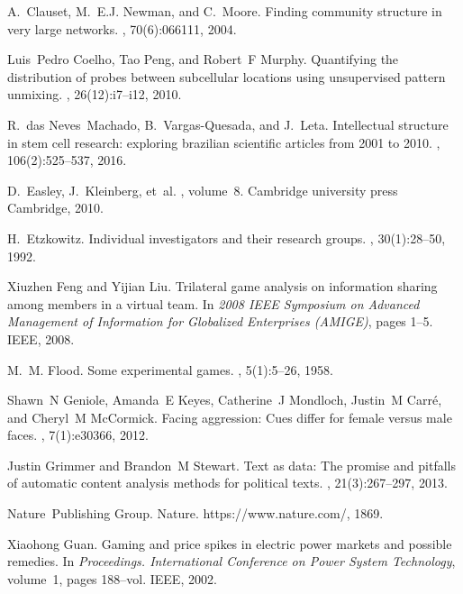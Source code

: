 \documentclass{article}
\theoremstyle{definition}
\begin{document}
\begin{thebibliography}{10}
    A.~Clauset, M.~E.J. Newman, and C.~Moore.
    \newblock Finding community structure in very large networks.
    , 70(6):066111, 2004.
    
    Luis~Pedro Coelho, Tao Peng, and Robert~F Murphy.
    \newblock Quantifying the distribution of probes between subcellular locations
      using unsupervised pattern unmixing.
    , 26(12):i7--i12, 2010.
    
    R.~das Neves~Machado, B.~Vargas-Quesada, and J.~Leta.
    \newblock Intellectual structure in stem cell research: exploring brazilian
      scientific articles from 2001 to 2010.
    , 106(2):525--537, 2016.
    
    D.~Easley, J.~Kleinberg, et~al.
    , volume~8.
    \newblock Cambridge university press Cambridge, 2010.
    
    H.~Etzkowitz.
    \newblock Individual investigators and their research groups.
    , 30(1):28--50, 1992.
    
    Xiuzhen Feng and Yijian Liu.
    \newblock Trilateral game analysis on information sharing among members in a
      virtual team.
    \newblock In {\em 2008 IEEE Symposium on Advanced Management of Information for
      Globalized Enterprises (AMIGE)}, pages 1--5. IEEE, 2008.
    
    M.~M. Flood.
    \newblock Some experimental games.
    , 5(1):5--26, 1958.
    
    Shawn~N Geniole, Amanda~E Keyes, Catherine~J Mondloch, Justin~M Carr{\'e}, and
      Cheryl~M McCormick.
    \newblock Facing aggression: Cues differ for female versus male faces.
    , 7(1):e30366, 2012.
    
    Justin Grimmer and Brandon~M Stewart.
    \newblock Text as data: The promise and pitfalls of automatic content analysis
      methods for political texts.
    , 21(3):267--297, 2013.
    
    Nature~Publishing Group.
    \newblock Nature.
    \newblock https://www.nature.com/, 1869.
    
    Xiaohong Guan.
    \newblock Gaming and price spikes in electric power markets and possible
      remedies.
    \newblock In {\em Proceedings. International Conference on Power System
      Technology}, volume~1, pages 188--vol. IEEE, 2002.
    

\end{thebibliography}
\end{document}
